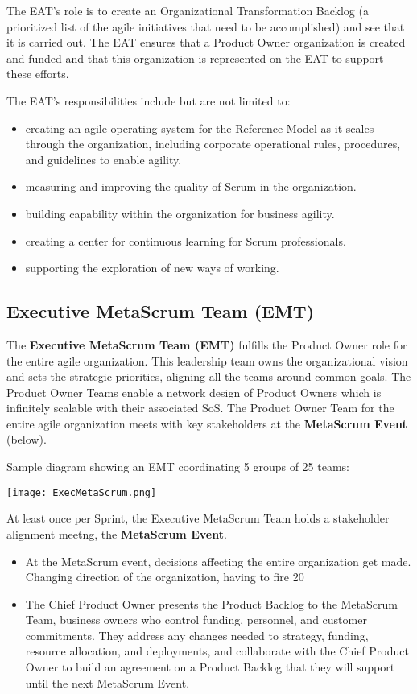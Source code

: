 \documentclass[12pt,a4paper,parskip=full]{scrartcl}
\begin{document}
The EAT's role is to create an Organizational Transformation Backlog (a prioritized list of the agile initiatives that need to be accomplished) and see that it is carried out. The EAT ensures that a Product Owner organization is created and funded and that this organization is represented on the EAT to support these efforts. 

The EAT's responsibilities include but are not limited to:

\begin{itemize}
	\item creating an agile operating system for the Reference Model as it scales through the organization, including corporate operational rules, procedures, and guidelines to enable agility.
	\item measuring and improving the quality of Scrum in the organization.
	\item building capability within the organization for business agility.
	\item creating a center for continuous learning for Scrum professionals.
	\item supporting the exploration of new ways of working.
\end{itemize}

\subsection{Executive MetaScrum Team (EMT)}

The \textbf{Executive MetaScrum Team (EMT)} fulfills the Product Owner role for the entire agile organization. This leadership team owns the organizational vision and sets the strategic priorities, aligning all the teams around common goals. The Product Owner Teams enable a network design of Product Owners which is infinitely scalable with their associated SoS. The Product Owner Team for the entire agile organization meets with key stakeholders at the \textbf{MetaScrum Event} (below).

Sample diagram showing an EMT coordinating 5 groups of 25 teams:

\texttt{[image: ExecMetaScrum.png]}

At least once per Sprint, the Executive MetaScrum Team holds a stakeholder alignment meetng, the \textbf{MetaScrum Event}. 

\begin{itemize}
	\item At the MetaScrum event, decisions affecting the entire organization get made. Changing direction of the organization, having to fire 20%
	\item The Chief Product Owner presents the Product Backlog to the MetaScrum Team, business owners who control funding, personnel, and customer commitments. They address any changes needed to strategy, funding, resource allocation, and deployments, and collaborate with the Chief Product Owner to build an agreement on a Product Backlog that they will support until the next MetaScrum Event.
\end{itemize}
\end{document}
